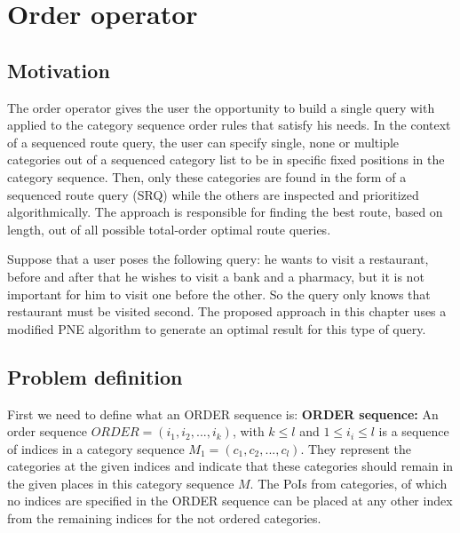 


\section{Order operator}

\subsection{Motivation}
\label{sec:motORDER}
The order operator gives the user the opportunity to build a single query with applied to the category sequence order rules that satisfy his needs. In the context of a sequenced route query, the user can specify single, none or multiple categories out of a sequenced category list to be in specific fixed positions in the category sequence. Then, only these categories are found in the form of a sequenced route query (SRQ) while the others are inspected and prioritized algorithmically. The approach is responsible for finding the best route, based on length, out of all possible total-order optimal route queries.

Suppose that a user poses the following query: he wants to visit a restaurant, before and after that he wishes to visit a bank and a pharmacy, but it is not important for him to visit one before the other. So the query only knows that restaurant must be visited second. The proposed approach in this chapter uses a modified PNE algorithm to generate an optimal result for this type of query.

\subsection{Problem definition} 
\label{sec:problemOrder}
First we need to define what an ORDER sequence is:\newline
\textbf{ORDER sequence:} An order sequence $ORDER = (i_1, i_2, ..., i_k)$, with $k \leq l$ and $1 \leq i_i \leq l$ is a sequence of indices in a category sequence $M_1 = (c_1, c_2, ..., c_l)$. They represent the categories at the given indices and indicate that these categories should remain in the given places in this category sequence $M$. The PoIs from categories, of which no indices are specified in the ORDER sequence can be placed at any other index from the remaining indices for the not ordered categories.

